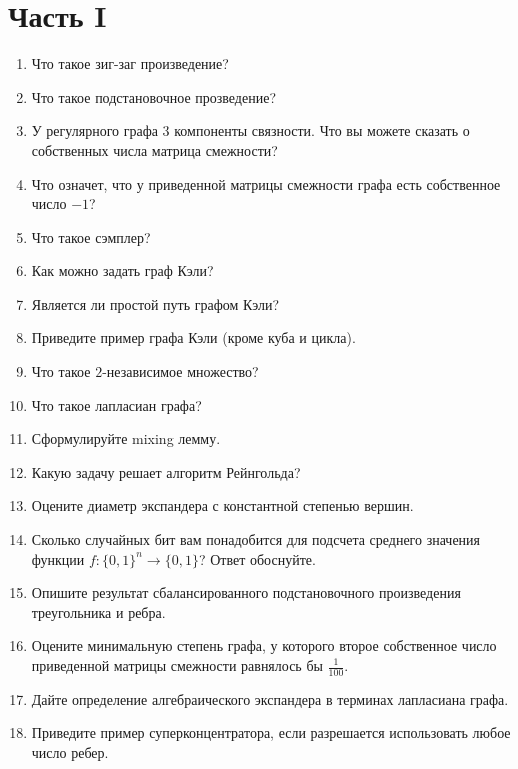 






\section*{Часть I}
\begin{enumerate}
    \item Что такое зиг-заг произведение?
    \item Что такое подстановочное прозведение?
    \item У регулярного графа $3$ компоненты связности. Что вы можете сказать о собственных числа матрица
        смежности?
    \item Что означет, что у приведенной матрицы смежности графа есть собственное число $-1$?
    \item Что такое сэмплер?
    \item Как можно задать граф Кэли?
    \item Является ли простой путь графом Кэли?
    \item Приведите пример графа Кэли (кроме куба и цикла).
    \item Что такое $2$-независимое множество?
    \item Что такое лапласиан графа?
    \item Сформулируйте mixing лемму.
    \item Какую задачу решает алгоритм Рейнгольда?
    \item Оцените диаметр экспандера с константной степенью вершин.
    \item Сколько случайных бит вам понадобится для подсчета среднего значения функции $f\colon \{0, 1\}^n
        \to \{0, 1\}$? Ответ обоснуйте.
    \item Опишите результат сбалансированного подстановочного произведения треугольника и ребра.
    \item Оцените минимальную степень графа, у которого второе собственное число приведенной матрицы
        смежности равнялось бы $\frac{1}{100}$.
    \item Дайте определение алгебраического экспандера в терминах лапласиана графа.
    \item Приведите пример суперконцентратора, если разрешается использовать любое число ребер.
\end{enumerate}

